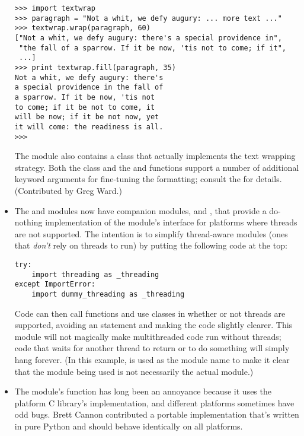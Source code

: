 \documentclass{howto}
\begin{document}
\begin{itemize}
\begin{verbatim}
>>> import textwrap
>>> paragraph = "Not a whit, we defy augury: ... more text ..."
>>> textwrap.wrap(paragraph, 60)
["Not a whit, we defy augury: there's a special providence in",
 "the fall of a sparrow. If it be now, 'tis not to come; if it",
 ...]
>>> print textwrap.fill(paragraph, 35)
Not a whit, we defy augury: there's
a special providence in the fall of
a sparrow. If it be now, 'tis not
to come; if it be not to come, it
will be now; if it be not now, yet
it will come: the readiness is all.
>>>
\end{verbatim}

The module also contains a  class that actually
implements the text wrapping strategy.   Both the
 class and the  and
 functions support a number of additional keyword
arguments for fine-tuning the formatting; consult the  for details.
(Contributed by Greg Ward.)

\item The  and  modules now have
companion modules,  and ,
that provide a do-nothing implementation of the 
module's interface for platforms where threads are not supported.  The
intention is to simplify thread-aware modules (ones that \emph{don't}
rely on threads to run) by putting the following code at the top:

\begin{verbatim}
try:
    import threading as _threading
except ImportError:
    import dummy_threading as _threading
\end{verbatim}

Code can then call functions and use classes in 
whether or not threads are supported, avoiding an 
statement and making the code slightly clearer.  This module will not
magically make multithreaded code run without threads; code that waits
for another thread to return or to do something will simply hang
forever.  (In this example,  is used as the module
name to make it clear that the module being used is not necessarily
the actual  module.)

\item The  module's  function has
long been an annoyance because it uses the platform C library's
 implementation, and different platforms
sometimes have odd bugs.  Brett Cannon contributed a portable
implementation that's written in pure Python and should behave
identically on all platforms.


\end{itemize}
\end{document}
